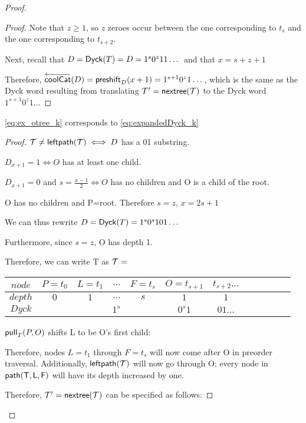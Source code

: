\begin{proof}
\begin{proof}
    Note that $z \ge 1$, so $z$ zeroes occur between the one corresponding to $t_{s}$ and the one corresponding to $t_{s+2}$.


    Next, recall that $D=\dyck{T}=D=1^s0^z11\dots$ and that $x=s+z+1$

    Therefore, $\coolCat{D}=\preshift{D}{x+1}=1^{s+1}0^z1\dots$, which is the same as the Dyck word resulting from translating $\tree{T}'=\nextTree{T}$ to the Dyck word $1^{s+1}0^z1\dots$

\end{proof}
\begin{lemma}
    \eqref{eq:ex_otree_k} corresponds to \eqref{eq:expandedDyck_k}
\end{lemma}
\begin{proof}

    $\tree{T} \ne \leftdown{\tree{T}} \iff D$ has a 01 substring.

    $D_{x+1}=1 \iff O$ has at least one child.

    $D_{x+1}=0$ and $s=\frac{x-1}{2} \iff O$ has no children and O is a child of the root.

    O has no children and P=root. Therefore $s=z$, $x=2s+1$

    We can thus rewrite $D=\dyck{T}=1^s0^s101\dots$

    Furthermore, since $s=z$, O has depth 1. 

    Therefore, we can write T as 
    \noindent $\tree{T}=$
    \begin{center}
	\begin{tabular}{ |c|c|c|c|c|c|c|c|c|c|c|c| } 
	    \hline

	    $node$ & $P=t_0$ & $L=t_1$ & $\dots$ & $F=t_s$ & $O=t_{s+1}$ & $t_{s+2}\dots$ \\
	    \hline
	    $depth$ & $0$ & $1$ & $\dots$ & $s$ & $1$ & $1$ \\
	    \hline
	    $Dyck$ &  &  \multicolumn{3}{|c|}{$1^s$} &  $0^{s}1$   & $01\dots$\\
	    \hline
	\end{tabular}
    \end{center}


    $\poppush[T]{P}{O}$
    shifts L to be O's first child:

    Therefore, nodes $L=t_{1}$ through $F=t_s$ will now come after O in preorder traversal.  Additionally, $\leftdown{\tree{T}}$ will now go through O; every node in $\path{T}{L}{F}$ will have its depth increased by one.  

    Therefore, $\tree{T}'=\nextTree{T}$ can be specified as follows: 


\end{proof}
\end{proof}

